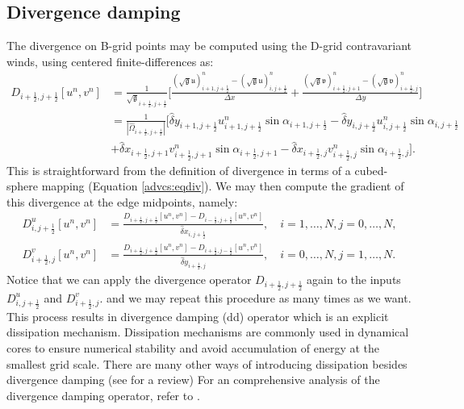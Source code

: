 \subsection{Divergence damping}
\label{dd-cs}
The divergence on B-grid points may be computed using the D-grid contravariant winds, using centered finite-differences as:
\begin{align*}
	\label{2d-sw-divdamp}
	D_{i+\frac{1}{2},j+\frac{1}{2}}[u^n,v^n] &=
	\frac{1}{\sqrt{\mathfrak{g}}_{i+\frac{1}{2},j+\frac{1}{2}}}\bigg[
	\frac{(\sqrt{\mathfrak{g}}\mathfrak{u})_{i+1,j+\frac{1}{2}}^n-(\sqrt{\mathfrak{g}}\mathfrak{u})_{i,j+\frac{1}{2}}^n}{\Delta x}+
	\frac{(\sqrt{\mathfrak{g}}\mathfrak{v})_{i+\frac{1}{2},j+1}^n-(\sqrt{\mathfrak{g}}\mathfrak{v})_{i+\frac{1}{2},j}^n}{\Delta y}
	\bigg]\nonumber\\
	&= 
	\frac{1}{|\hat{\Omega}_{i+\frac{1}{2},j+\frac{1}{2}}|}\bigg[
	{\hat{\delta}y_{i+1,j+\frac{1}{2}}{u}_{i+1,j+\frac{1}{2}}^n\sin{\alpha}_{i+1,j+\frac{1}{2}}-
	 \hat{\delta}y_{i  ,j+\frac{1}{2}}{u}_{i  ,j+\frac{1}{2}}^n\sin{\alpha}_{i  ,j+\frac{1}{2}}}\\
	&+{\hat{\delta}x_{i+\frac{1}{2},j+1}{v}_{i+\frac{1}{2},j+1}^n\sin{\alpha}_{i+\frac{1}{2},j+1}-
 	   \hat{\delta}x_{i+\frac{1}{2},j  }{v}_{i+\frac{1}{2},j  }^n\sin{\alpha}_{i+\frac{1}{2},j  }}
	\bigg].
\end{align*}
This is straightforward from the definition of divergence in terms of a cubed-sphere mapping (Equation \eqref{advcs:eqdiv}).
We may then compute the gradient of this divergence at the edge midpoints, namely:
\begin{align}
	D^u_{i,j+\frac{1}{2}}[u^n,v^n] &= \frac{D_{i+\frac{1}{2},j+\frac{1}{2}}[u^n,v^n]- D_{i-\frac{1}{2},j+\frac{1}{2}}[u^n,v^n]}{\hat{\delta}x_{i,j+\frac{1}{2}}},
	\quad i=1,\ldots,N, j=0,\ldots,N,\\
	D^v_{i+\frac{1}{2},j}[u^n,v^n] &= \frac{D_{i+\frac{1}{2},j+\frac{1}{2}}[u^n,v^n]- D_{i+\frac{1}{2},j-\frac{1}{2}}[u^n,v^n]}{\hat{\delta}y_{i+\frac{1}{2},j}},
	\quad i=0,\ldots,N, j=1,\ldots,N.
\end{align}
Notice that we can apply the divergence operator $D_{i+\frac{1}{2},j+\frac{1}{2}}$
again to the inputs $D^u_{i,j+\frac{1}{2}}$ and $D^v_{i+\frac{1}{2},j}$.
and we may repeat this procedure as many times as we want.
This process results in divergence damping (dd) operator which is an explicit dissipation mechanism.
Dissipation mechanisms are commonly used in dynamical cores to ensure numerical stability and avoid accumulation of energy at the smallest grid scale.
There are many other ways of introducing dissipation besides divergence damping (see \citet{jablonowski:2011} for a review)
For an comprehensive analysis of the divergence damping operator, refer to \citet{whitehead:2011}. 

